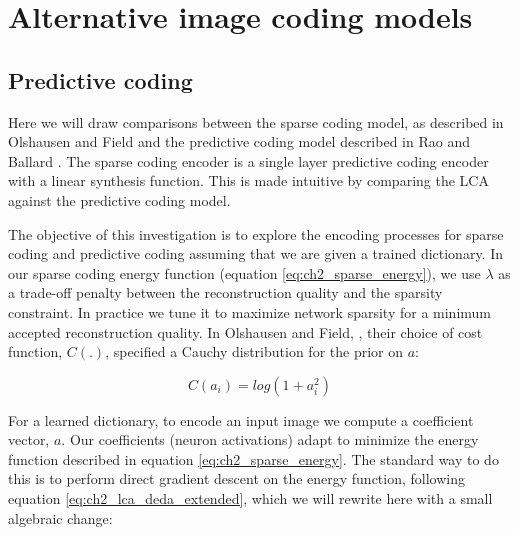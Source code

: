 \section{Alternative image coding models}\label{sec:ch2_alternative_image_coding_models}

%
%


\subsection{Predictive coding}
Here we will draw comparisons between the sparse coding model, as described in Olshausen and Field \citeyearpar{olshausen1997sparse} and the predictive coding model described in Rao and Ballard \citeyearpar{rao1999predictive}. The sparse coding encoder is a single layer predictive coding encoder with a linear synthesis function. This is made intuitive by comparing the LCA against the predictive coding model.

The objective of this investigation is to explore the encoding processes for sparse coding and predictive coding assuming that we are given a trained dictionary. In our sparse coding energy function (equation \eqref{eq:ch2_sparse_energy}), we use $\lambda$ as a trade-off penalty between the reconstruction quality and the sparsity constraint. In practice we tune it to maximize network sparsity for a minimum accepted reconstruction quality. In Olshausen and Field, \citeyearpar{olshausen1997sparse}, their choice of cost function, $C(.)$, specified a Cauchy distribution for the prior on $a$:

\begin{equation}\label{eq:ch2_cauchy_cost}
  C(a_{i}) = log(1+a_{i}^{2})
\end{equation}

For a learned dictionary, to encode an input image we compute a coefficient vector, $a$. Our coefficients (neuron activations) adapt to minimize the energy function described in equation \eqref{eq:ch2_sparse_energy}. The standard way to do this is to perform direct gradient descent on the energy function, following equation \eqref{eq:ch2_lca_deda_extended}, which we will rewrite here with a small algebraic change:

